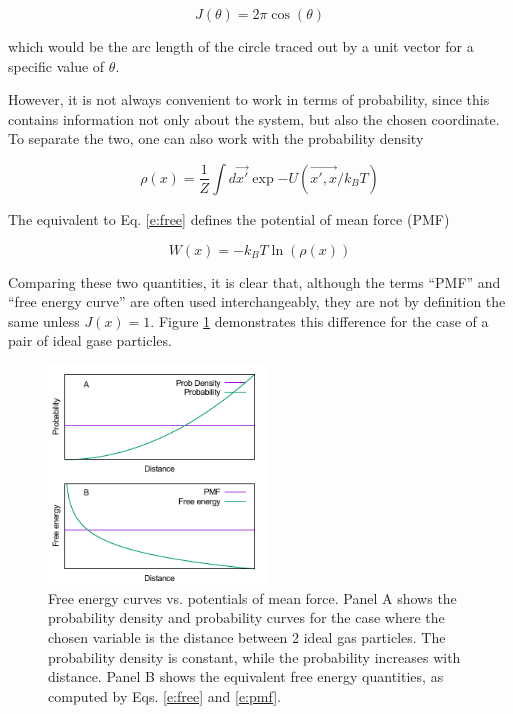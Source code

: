 \begin{equation}
J(\theta) = 2 \pi \cos(\theta)
\end{equation}

which would be the arc length of the circle traced out by a unit vector for a
specific value of $\theta$.

However, it is not always convenient to work in terms of probability, since this
contains information not only about the system, but also the chosen coordinate.
To separate the two, one can also work with the probability density

\begin{equation}
    \label{e:dens}
    \rho(x) = \frac{1}{Z} \int d\vec{x'} \exp{-U(\vec{x', x}/k_B T)}
\end{equation}

\noindent
The equivalent to Eq. \ref{e:free} defines the potential of mean force (PMF)

\begin{equation}
    \label{e:pmf}
    W(x) = - k_B T \ln(\rho(x))
\end{equation}

Comparing these two quantities, it is clear that, although the terms ``PMF'' and
``free energy curve'' are often used interchangeably, they are not by definition
the same unless $J(x)=1$.  Figure \ref{f:free} demonstrates this difference for the case of a pair of ideal gase particles.

\begin{figure}
    \includegraphics[width=5.8cm]{figures/ideal_gas/free}
    \caption{\label{f:free}
    Free energy curves vs. potentials of mean force.  Panel A shows the probability density and probability curves for the case where the chosen variable is the distance between 2 ideal gas particles.  The probability density is constant, while the probability increases with distance.  Panel B shows the equivalent free energy quantities, as computed by Eqs. \ref{e:free} and \ref{e:pmf}.
    }
\end{figure}


